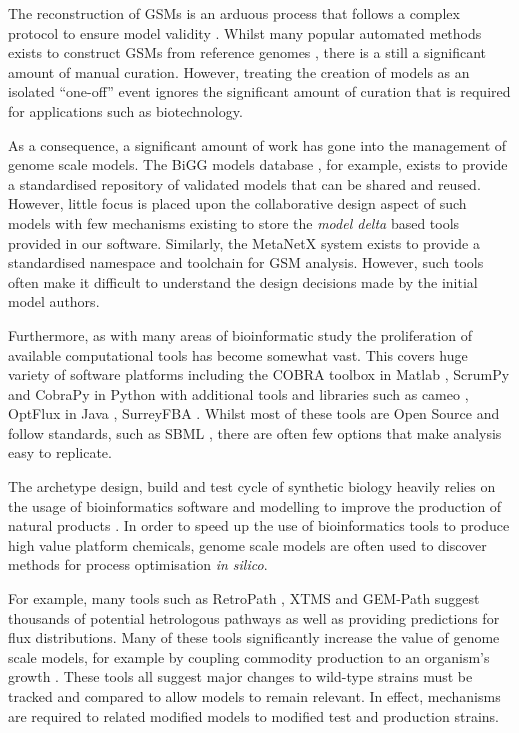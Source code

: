 \documentclass[a4paper,10pt]{article}
\begin{document}
The reconstruction of GSMs is an arduous process that follows a complex protocol to ensure model validity \cite{thiele2010protocol}.
Whilst many popular automated methods exists to construct GSMs from reference genomes \cite{henry2010high, poolman2006scrumpy}, there is a still a significant amount of manual curation.
However, treating the creation of models as an isolated ``one-off'' event ignores the significant amount of curation that is required for applications such as biotechnology.

As a consequence, a significant amount of work has gone into the management of genome scale models.
The BiGG models database \cite{king2015bigg}, for example, exists to provide a standardised repository of validated models that can be shared and reused.
However, little focus is placed upon the collaborative design aspect of such models with few mechanisms existing to store the \textit{model delta} based tools provided in our software.
Similarly, the MetaNetX \cite{moretti2016metanetx} system exists to provide a standardised namespace and toolchain for GSM analysis.
However, such tools often make it difficult to understand the design decisions made by the initial model authors.

Furthermore, as with many areas of bioinformatic study the proliferation of available computational tools has become somewhat vast.
This covers huge variety of software platforms including the COBRA toolbox in Matlab \cite{schellenberger2011quantitative}, ScrumPy and CobraPy in Python \cite{poolman2006scrumpy, ebrahim2013cobrapy} with additional tools and libraries such as cameo \cite{cardoso2017cameo}, OptFlux in Java \cite{rocha2010optflux}, SurreyFBA \cite{gevorgyan2010surreyfba}.
Whilst most of these tools are Open Source and follow standards, such as SBML \cite{finney2003systems}, there are often few options that make analysis easy to replicate.

The archetype design, build and test cycle of synthetic biology heavily relies on the usage of bioinformatics software and modelling to improve the production of natural products \cite{carbonell2016bioinformatics}.
In order to speed up the use of bioinformatics tools to produce high value platform chemicals, genome scale models are often used to discover methods for process optimisation \textit{in silico}.

For example, many tools such as RetroPath \cite{carbonell2013retropath}, XTMS \cite{carbonell2014xtms} and GEM-Path \cite{campodonico2014generation} suggest thousands of potential hetrologous pathways as well as providing predictions for flux distributions.
Many of these tools significantly increase the value of genome scale models, for example by coupling commodity production to an organism's growth \cite{feist2010model}.
These tools all suggest major changes to wild-type strains must be tracked and compared to allow models to remain relevant.
In effect, mechanisms are required to related modified models to modified test and production strains.
\end{document}
